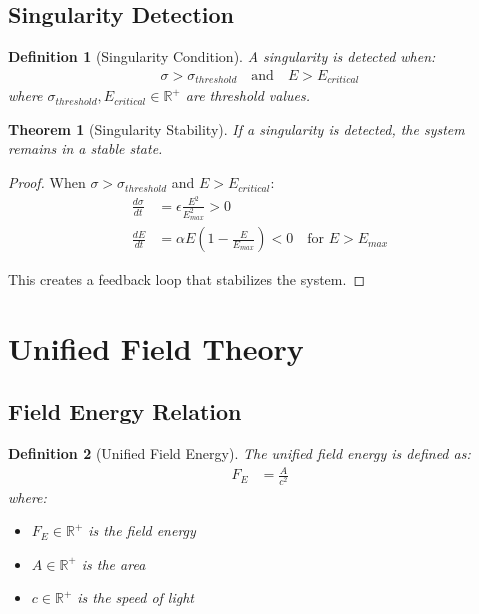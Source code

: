 \documentclass[12pt,a4paper]{article}
\newtheorem{definition}{Definition}
\newtheorem{theorem}{Theorem}
\begin{document}
\subsection{Singularity Detection}

\begin{definition}[Singularity Condition]
A singularity is detected when:
\begin{align}
\sigma > \sigma_{threshold} \quad \text{and} \quad E > E_{critical}
\end{align}
where $\sigma_{threshold}, E_{critical} \in \mathbb{R}^+$ are threshold values.
\end{definition}

\begin{theorem}[Singularity Stability]
If a singularity is detected, the system remains in a stable state.
\end{theorem}

\begin{proof}
When $\sigma > \sigma_{threshold}$ and $E > E_{critical}$:
\begin{align}
\frac{d\sigma}{dt} &= \epsilon \frac{E^2}{E_{max}^2} > 0 \\
\frac{dE}{dt} &= \alpha E \left(1 - \frac{E}{E_{max}}\right) < 0 \quad \text{for } E > E_{max}
\end{align}

This creates a feedback loop that stabilizes the system.
\end{proof}

\section{Unified Field Theory}

\subsection{Field Energy Relation}

\begin{definition}[Unified Field Energy]
The unified field energy is defined as:
\begin{align}
F_E &= \frac{A}{c^2}
\end{align}
where:
\begin{itemize}
\item $F_E \in \mathbb{R}^+$ is the field energy
\item $A \in \mathbb{R}^+$ is the area
\item $c \in \mathbb{R}^+$ is the speed of light
\end{itemize}
\end{definition}
\end{document}
